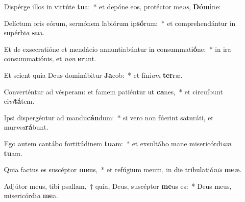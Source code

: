 \item Dispérge illos in virtúte \textbf{tu}a:~* et depóne eos, protéctor me\textit{us}, \textbf{Dó}\textbf{mi}ne:
\item Delíctum oris eórum, sermónem labiórum ip\textbf{só}rum:~* et comprehendántur in supérbi\textit{a} \textbf{su}a.
\item Et de exsecratióne et mendácio annuntiabúntur in consummati\textbf{ó}ne:~* in ira consummatiónis, et \textit{non} \textbf{e}runt.
\item Et scient quia Deus dominábitur \textbf{Ja}cob:~* et fíni\textit{um} \textbf{ter}ræ.
\item Converténtur ad vésperam: et famem patiéntur ut \textbf{ca}nes,~* et circuíbunt ci\textit{vi}\textbf{tá}tem.
\item Ipsi dispergéntur ad mandu\textbf{cán}dum:~* si vero non fúerint saturáti, et mur\textit{mu}\textbf{rá}bunt.
\item Ego autem cantábo fortitúdinem \textbf{tu}am:~* et exsultábo mane misericórdi\textit{am} \textbf{tu}am.
\item Quia factus es suscéptor \textbf{me}us,~* et refúgium meum, in die tribulatió\textit{nis} \textbf{me}æ.
\item Adjútor meus, tibi psallam,~† quia, Deus, suscéptor \textbf{me}us es:~* Deus meus, misericórdi\textit{a} \textbf{me}a.
